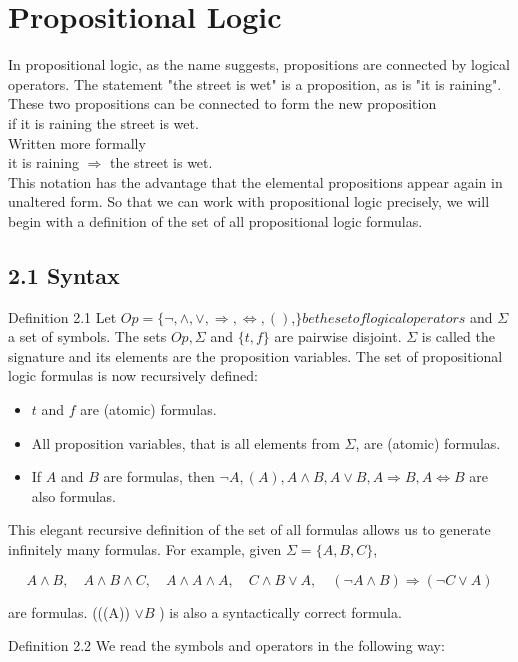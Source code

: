 \documentclass[10pt]{article}
\begin{document}
\section*{Propositional Logic}
In propositional logic, as the name suggests, propositions are connected by logical operators. The statement "the street is wet" is a proposition, as is "it is raining". These two propositions can be connected to form the new proposition\\
if it is raining the street is wet.\\
Written more formally\\
it is raining $\Rightarrow$ the street is wet.\\
This notation has the advantage that the elemental propositions appear again in unaltered form. So that we can work with propositional logic precisely, we will begin with a definition of the set of all propositional logic formulas.

\subsection*{2.1 Syntax}
Definition 2.1 Let $O p=\{\neg, \wedge, \vee, \Rightarrow, \Leftrightarrow,()$,$\} be the set of logical operators$ and $\Sigma$ a set of symbols. The sets $O p, \Sigma$ and $\{t, f\}$ are pairwise disjoint. $\Sigma$ is called the signature and its elements are the proposition variables. The set of propositional logic formulas is now recursively defined:

\begin{itemize}
  \item $t$ and $f$ are (atomic) formulas.
  \item All proposition variables, that is all elements from $\Sigma$, are (atomic) formulas.
  \item If $A$ and $B$ are formulas, then $\neg A,(A), A \wedge B, A \vee B, A \Rightarrow B, A \Leftrightarrow B$ are also formulas.
\end{itemize}

This elegant recursive definition of the set of all formulas allows us to generate infinitely many formulas. For example, given $\Sigma=\{A, B, C\}$,

$$
A \wedge B, \quad A \wedge B \wedge C, \quad A \wedge A \wedge A, \quad C \wedge B \vee A, \quad(\neg A \wedge B) \Rightarrow(\neg C \vee A)
$$

are formulas. (((A)) $\vee B$ ) is also a syntactically correct formula.

Definition 2.2 We read the symbols and operators in the following way:
\end{document}
